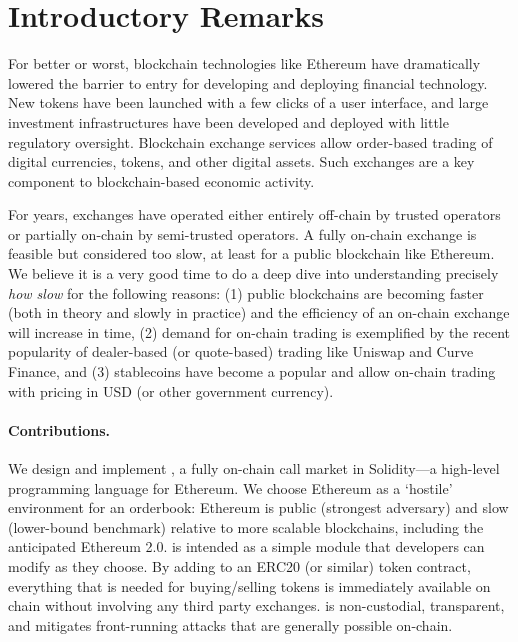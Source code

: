 
\section{Introductory Remarks}

For better or worst, blockchain technologies like Ethereum have dramatically lowered the barrier to entry for developing and deploying financial technology. New tokens have been launched with a few clicks of a user interface, and large investment infrastructures have been developed and deployed with little regulatory oversight. Blockchain exchange services allow order-based trading of digital currencies, tokens, and other digital assets. Such exchanges are a key component to blockchain-based economic activity. 

For years, exchanges have operated either entirely off-chain by trusted operators or partially on-chain by semi-trusted operators. A fully on-chain exchange is feasible but considered too slow, at least for a public blockchain like Ethereum. We believe it is a very good time to do a deep dive into understanding precisely \textit{how slow} for the following reasons: (1) public blockchains are becoming faster (both in theory and slowly in practice) and the efficiency of an on-chain exchange will increase in time, (2) demand for on-chain trading is exemplified by the recent popularity of dealer-based (or quote-based) trading like Uniswap and Curve Finance, and (3) stablecoins have become a popular and allow on-chain trading with pricing in USD (or other government currency).

\paragraph{Contributions.} We design and implement \cm, a fully on-chain call market in Solidity---a high-level programming language for Ethereum. We choose Ethereum as a `hostile' environment for an orderbook: Ethereum is public (strongest adversary) and slow (lower-bound benchmark) relative to more scalable blockchains, including the anticipated Ethereum 2.0. \cm is intended as a simple module that developers can modify as they choose. By adding \cm to an ERC20 (or similar) token contract, everything that is needed for buying/selling tokens is immediately available on chain without involving any third party exchanges. \cm is non-custodial, transparent, and mitigates front-running attacks that are generally possible on-chain.

